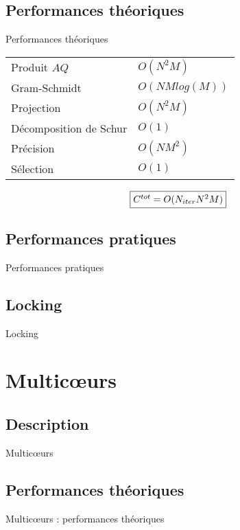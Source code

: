 \documentclass[9.5pt]{beamer}
\begin{document}
	\subsection{Performances théoriques}
		\begin{frame}{Performances théoriques}
			\begin{tabular}{ l l }
				Produit $AQ$ & $O(N^2M)$ \\
				Gram-Schmidt & $O(NMlog(M))$ \\
				Projection & $O(N^2M)$ \\
				Décomposition de Schur & $O(1)$ \\
				Précision & $O(NM^2)$ \\
				Sélection & $O(1)$ \\
			\end{tabular}

			
			$$
			\fbox{$C^{tot} = O(N_{iter}N^2M)$}
			$$
		\end{frame}

	\subsection{Performances pratiques}
		\begin{frame}{Performances pratiques}

		\end{frame}

	\subsection{Locking}
		\begin{frame}{Locking}

		\end{frame}

\section{Multic\oe{}urs}
		\subsection{Description}
		\begin{frame}{Multic\oe{}urs}

		\end{frame}

	\subsection{Performances théoriques}
		\begin{frame}{Multic\oe{}urs : performances théoriques}

		\end{frame}
\end{document}
